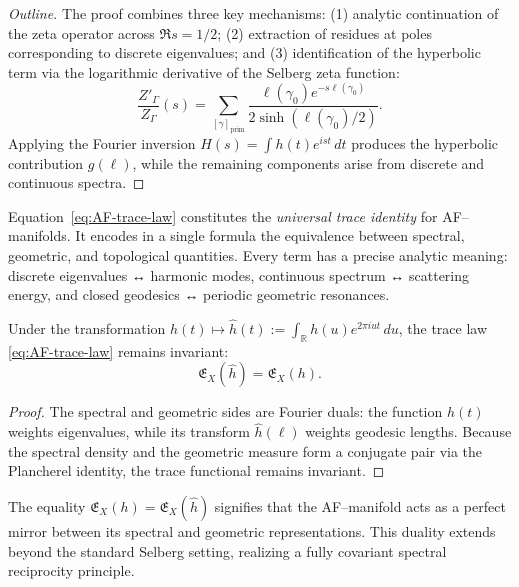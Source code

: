\begin{proof}[Outline]
The proof combines three key mechanisms:
(1) analytic continuation of the zeta operator across \(\Re s = 1/2\);
(2) extraction of residues at poles corresponding to discrete eigenvalues;
and (3) identification of the hyperbolic term via the logarithmic derivative
of the Selberg zeta function:
\[
\frac{Z'_\Gamma}{Z_\Gamma}(s)
=
\sum_{[\gamma]_{\mathrm{prim}}}
\frac{\ell(\gamma_0)e^{-s\ell(\gamma_0)}}{2\sinh(\ell(\gamma_0)/2)}.
\]
Applying the Fourier inversion \(H(s) = \int h(t)e^{ist}\,dt\)
produces the hyperbolic contribution \(g(\ell)\),
while the remaining components arise from discrete and continuous spectra.
\end{proof}

\begin{remark}[Interpretation]
Equation~\eqref{eq:AF-trace-law}
constitutes the \emph{universal trace identity} for AF–manifolds.
It encodes in a single formula
the equivalence between spectral, geometric, and topological quantities.
Every term has a precise analytic meaning:
discrete eigenvalues ↔ harmonic modes,
continuous spectrum ↔ scattering energy,
and closed geodesics ↔ periodic geometric resonances.
\end{remark}


\begin{theorem}
\label{thm:aeonic-duality}
Under the transformation
\(h(t) \mapsto \widehat{h}(t)
:= \int_{\mathbb{R}} h(u)e^{2\pi iut}\,du\),
the trace law \eqref{eq:AF-trace-law}
remains invariant:
\begin{equation}
\label{eq:duality}
\mathfrak{E}_X(\widehat{h})
=
\mathfrak{E}_X(h).
\end{equation}
\end{theorem}

\begin{proof}
The spectral and geometric sides are Fourier duals:
the function \(h(t)\)
weights eigenvalues,
while its transform \(\widehat{h}(\ell)\)
weights geodesic lengths.
Because the spectral density and the geometric measure
form a conjugate pair via the Plancherel identity,
the trace functional remains invariant.
\end{proof}

\begin{remark}
The equality \(\mathfrak{E}_X(h)=\mathfrak{E}_X(\widehat{h})\)
signifies that the AF–manifold acts as a perfect mirror
between its spectral and geometric representations.
This duality extends beyond the standard Selberg setting,
realizing a fully covariant spectral reciprocity principle.
\end{remark}

